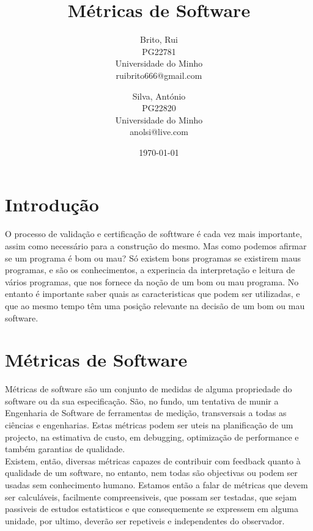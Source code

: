\documentclass[a4paper,10pt,openright,openbib,twocolumn]{article}
\begin{document}
\title{Métricas de Software}
\date{\today}
\begin{multicols}{2}
\author{
    Brito, Rui\\
    PG22781\\
    Universidade do Minho\\
    ruibrito666@gmail.com
  \and
    Silva, António\\
    PG22820\\
    Universidade do Minho\\
    anolsi@live.com
}
\date{}
\maketitle
\end{multicols}

\begin{abstract}
\end{abstract}

\section{Introdução} 
O processo de validação e certificação de softtware é cada vez mais importante, assim como necessário para a construção do mesmo.
Mas como podemos afirmar se um programa  é bom ou mau? Só existem bons programas se existirem maus programas, e são os conhecimentos, a experincia da interpretação e leitura de vários programas, que nos fornece da noção de um bom ou mau programa.
No entanto  é importante saber quais as caracteristicas que podem ser utilizadas, e que ao mesmo tempo têm uma posição relevante na decisão de um bom ou mau software.
\section{Métricas de Software}
\label{sec:swmetrics}
Métricas de software são um conjunto de medidas de alguma propriedade do software ou da sua especificação. São, no fundo, um tentativa de munir a Engenharia de Software de ferramentas de medição, transversais a todas as ciências e engenharias. Estas métricas podem ser uteis na planificação de um projecto, na estimativa de custo, em debugging, optimização de performance e também garantias de qualidade.\\
Existem, então, diversas métricas capazes de contribuir com feedback quanto à qualidade de um software, no entanto, nem todas são objectivas ou podem ser usadas sem conhecimento humano. Estamos então a falar de métricas que devem ser calculáveis, facilmente compreensiveis, que possam ser testadas, que sejam passiveis de estudos estatisticos e que consequemente se expressem em alguma unidade, por ultimo, deverão ser repetiveis e independentes do observador.
\end{document}
